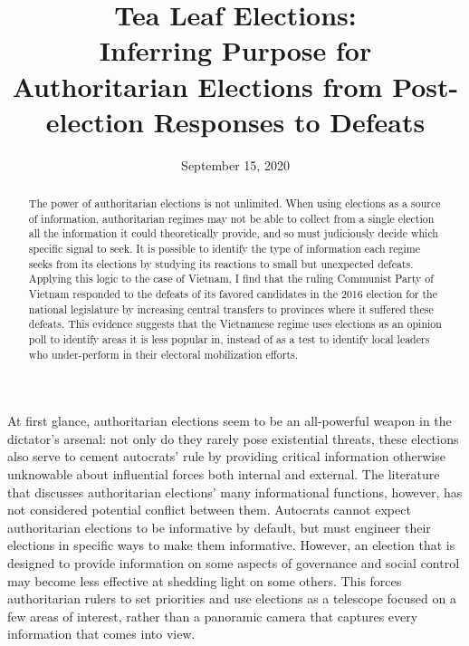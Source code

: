\documentclass[12pt]{article}
\title{Tea Leaf Elections: \\
	Inferring Purpose for Authoritarian Elections from Post-election Responses to Defeats%
	\\
	\vspace{2ex}
	\vphantom{Online Appendix}}
\date{September 15, 2020}
\newcommand{\1}{\mathbbm{1}}
\begin{document}
	

\maketitle
\thispagestyle{empty}
\doublespacing


\begin{abstract}
The power of authoritarian elections is not unlimited. When using elections as a source of information, authoritarian regimes may not be able to collect from a single election all the information it could theoretically provide, and so must judiciously decide which specific signal to seek. It is possible to identify the type of information each regime seeks from its elections by studying its reactions to small but unexpected defeats. Applying this logic to the case of Vietnam, I find that the ruling Communist Party of Vietnam responded to the defeats of its favored candidates in the 2016 election for the national legislature by increasing central transfers to provinces where it suffered these defeats. This evidence suggests that the Vietnamese regime uses elections as an opinion poll to identify areas it is less popular in, instead of as a test to identify local leaders who under-perform in their electoral mobilization efforts.
\end{abstract}



\newpage



At first glance, authoritarian elections seem to be an all-powerful weapon in the dictator's arsenal: not only do they rarely pose existential threats, these elections also serve to cement autocrats' rule by providing critical information otherwise unknowable about influential forces both internal and external. The literature that discusses authoritarian elections' many informational functions, however, has not considered potential conflict between them. Autocrats cannot expect authoritarian elections to be informative by default, but must engineer their elections in specific ways to make them informative. However, an election that is designed to provide information on some aspects of governance and social control may become less effective at shedding light on some others. This forces authoritarian rulers to set priorities and use elections as a telescope focused on a few areas of interest, rather than a panoramic camera that captures every information that comes into view.
\end{document}
